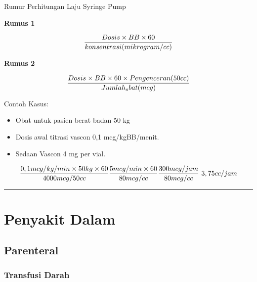 \documentclass[
]{book}
\providecommand{\tightlist}{%
  \setlength{\itemsep}{0pt}\setlength{\parskip}{0pt}}
\begin{document}
Rumur Perhitungan Laju Syringe Pump

\textbf{Rumus 1}

\begin{equation}
\\
\frac{Dosis \times BB \times 60}{konsentrasi (mikrogram/cc)}
\\
\end{equation}

\textbf{Rumus 2}

\begin{equation}
\\
\frac{Dosis \times BB \times 60 \times Pengenceran(50 cc)}{Jumlah_obat (mcg)}
\end{equation}

Contoh Kasus:

\begin{itemize}
\tightlist
\item
  Obat untuk pasien berat badan 50 kg
\item
  Dosis awal titrasi vascon 0,1 mcg/kgBB/menit.
\item
  Sedaan Vascon 4 mg per vial.
\end{itemize}

\begin{equation}
\frac{0,1 mcg/kg/min \times 50 kg \times 60}{4000 mcg/50cc}
\\
\frac{5 mcg/min \times 60}{80mcg/cc}
\\ 
\frac{300 mcg/jam}{80 mcg/cc}
\\ 
\ 3,75 cc/jam
\\
\end{equation}

\begin{center}\rule{0.5\linewidth}{0.5pt}\end{center}

\hypertarget{penyakit-dalam-2}{%
\section{Penyakit Dalam}\label{penyakit-dalam-2}}

\hypertarget{parenteral}{%
\subsection{Parenteral}\label{parenteral}}

\hypertarget{transfusi-darah}{%
\subsubsection{Transfusi Darah}\label{transfusi-darah}}
\end{document}
